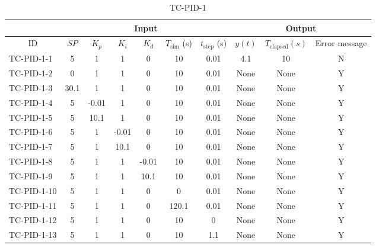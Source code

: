 \documentclass[12pt, titlepage]{article}
\begin{document}
\begin{table}[]
\caption{TC-PID-1}
\label{tbltc001}
\begin{tabular}{@{}lccccccccc@{}}
\toprule
\multicolumn{1}{l|}{}   & \multicolumn{6}{c|}{Input}  & \multicolumn{3}{c}{Output}\\     
\midrule \multicolumn{1}{c|}{ID} & $SP$ & $K_p$ & $K_i$ & $K_d$ & $T_\text{sim}$ (s)
 & \multicolumn{1}{c|}{$t_\text{step}$ (s)} & $y(t)$ & $T_\text{elapsed} (s)$ & Error
message \\ \midrule
TC-PID-1-1 & 5    & 1     & 1     & 0     & 10    & 0.01 & 4.1   & 10    & N\\
TC-PID-1-2 & 0    & 1     & 1     & 0     & 10    & 0.01 & None & None & Y\\
TC-PID-1-3 & 30.1 & 1     & 1     & 0     & 10    & 0.01 & None & None & Y \\
TC-PID-1-4 & 5    & -0.01 & 1     & 0     & 10    & 0.01 & None & None & Y \\
TC-PID-1-5 & 5    & 10.1  & 1     & 0     & 10    & 0.01 & None & None & Y \\
TC-PID-1-6 & 5    & 1     & -0.01 & 0     & 10    & 0.01 & None & None & Y \\
TC-PID-1-7 & 5    & 1     & 10.1  & 0     & 10    & 0.01 & None & None & Y \\
TC-PID-1-8 & 5    & 1     & 1     & -0.01 & 10    & 0.01 & None & None & Y \\
TC-PID-1-9 & 5    & 1     & 1     & 10.1  & 10    & 0.01 & None & None & Y \\
TC-PID-1-10 & 5    & 1     & 1     & 0     & 0     & 0.01 & None & None & Y \\
TC-PID-1-11 & 5    & 1     & 1     & 0     & 120.1 & 0.01 & None & None & Y \\
TC-PID-1-12 & 5    & 1     & 1     & 0     & 10    & 0    & None & None & Y \\
TC-PID-1-13 & 5    & 1     & 1     & 0     & 10    & 1.1  & None & None & Y \\ \bottomrule
\end{tabular}
\end{table}
\end{document}
